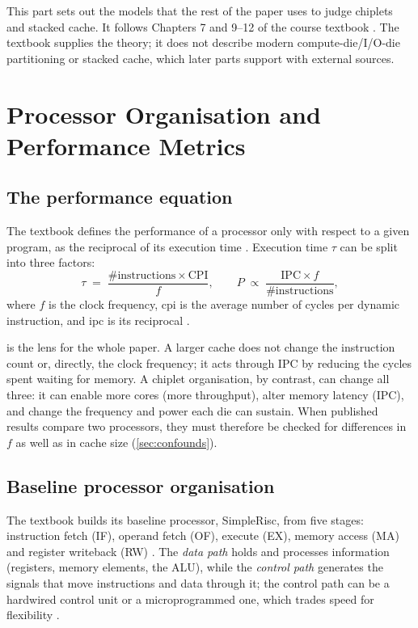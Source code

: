 This part sets out the models that the rest of the paper uses to judge chiplets and stacked cache. It follows Chapters 7 and 9--12 of the course textbook \cite{sarangi2025basic}. The textbook supplies the theory; it does not describe modern compute-die/I/O-die partitioning or stacked cache, which later parts support with external sources.

\section{Processor Organisation and Performance Metrics}
\label{sec:perf-metrics}

\subsection{The performance equation}

The textbook defines the performance of a processor only with respect to a given program, as the reciprocal of its execution time \cite[sec.~10.9.1]{sarangi2025basic}. Execution time $\tau$ can be split into three factors:
\begin{equation}
  \tau \;=\; \frac{\#\text{instructions} \times \mathrm{CPI}}{f},
  \qquad
  P \;\propto\; \frac{\mathrm{IPC} \times f}{\#\text{instructions}},
  \label{eq:perf}
\end{equation}
where $f$ is the clock frequency, \gls{cpi} is the average number of cycles per dynamic instruction, and \gls{ipc} is its reciprocal \cite[sec.~10.9.1]{sarangi2025basic}.

 is the lens for the whole paper. A larger cache does not change the instruction count or, directly, the clock frequency; it acts through IPC by reducing the cycles spent waiting for memory. A chiplet organisation, by contrast, can change all three: it can enable more cores (more throughput), alter memory latency (IPC), and change the frequency and power each die can sustain. When published results compare two processors, they must therefore be checked for differences in $f$ as well as in cache size (\cref{sec:confounds}).

\subsection{Baseline processor organisation}
The textbook builds its baseline processor, SimpleRisc, from five stages: instruction fetch (IF), operand fetch (OF), execute (EX), memory access (MA) and register writeback (RW) \cite[sec.~9.9.1]{sarangi2025basic}. The \emph{data path} holds and processes information (registers, memory elements, the ALU), while the \emph{control path} generates the signals that move instructions and data through it; the control path can be a hardwired control unit or a microprogrammed one, which trades speed for flexibility \cite[secs.~9.2--9.8]{sarangi2025basic}.


